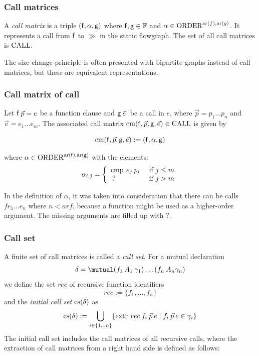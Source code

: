\newcommand{\call}{\opn{CALL}}
\newcommand{\cm}{\opn{cm}}
\newcommand{\cs}{\opn{cs}}
\newcommand{\complete}{\opn{complete}}

\subsubsection{Call matrices}
A \emph{call matrix} is a triple $(\mathsf{f},\alpha,\mathsf{g})$ where $\mathsf{f},\mathsf{g} \in \mathbb{F}$ and $\alpha \in \operatorname{ORDER}^{\operatorname{ar}(f),\operatorname{ar}(g)}$.
It represents a call from $\mathsf{f}$ to $\gg$ in the static flowgraph. The set of all call matrices is $\call$.

The size-change principle is often presented with bipartite graphs instead of call matrices, but these are
equivalent representations.


\subsubsection{Call matrix of call}
Let $\mathsf{f} \: \vec{p} = e$ be a function clause and $\mathsf{g} \: \vec{e}\:$ be a call in $e$,
where $\vec{p} = p_1 \ldots p_n$ and $\vec{e} = e_1 \ldots e_m$.
The associated call matrix $\cm(\ff,\vec{p},\fg,\vec{e}) \in \call $ is given by 

\[\cm(\ff,\vec{p},\fg,\vec{e}) := (\ff,\alpha,\fg) \]


where $\alpha \in \operatorname{ORDER}^{\operatorname{ar}(\mathsf{f}),\operatorname{ar}(\mathsf{g})} $ with the elements:
\[ 
\alpha_{i,j} = \left\{ \begin{array}{ll}
    \operatorname{cmp} \: e_j \: p_i & \mbox{ if } j \leq m \\
    \: ?  & \mbox{ if } j > m
 \end{array}\right.
\]

    
In the definition of $\alpha$, it was taken into consideration that there can be calls $f e_1 \ldots e_n$ where $n < ar f$, because a function might be used as a higher-order argument. The missing arguments are filled up with $?$. 

\subsubsection{Call set}
A finite set of call matrices is called a \emph{call set}.
For a mutual declaration 
\[ \delta = \mutual (f_1 \: A_1 \: \gamma_1) \ldots (f_n \: A_n \gamma_n) \] 
we define the set $rec$ of recursive function identifiers
\[ rec := \{ f_1 , \ldots , f_n \} \]
and the \emph{initial call set} $\cs(\delta)$ as
\[ \cs(\delta) := \bigcup_{i \in \{1 \ldots n\}} \{ \extr \: rec \: f_i \: \vec{p} \: e \mid f_i \: \vec{p} \: e \in \gamma_i  \} \] 
The initial call set includes the call matrices of all recursive calls, where the extraction of call matrices from a right hand side is defined as follows:
